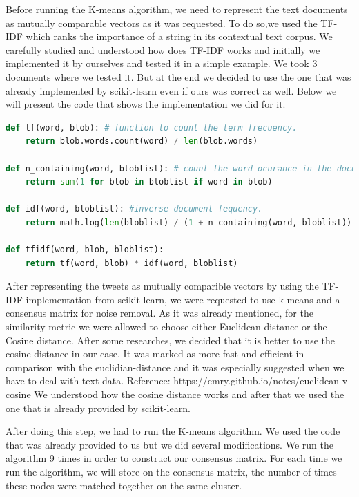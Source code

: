 \documentclass{article}
\begin{document}
Before running the K-means algorithm, we need to represent the text documents as mutually comparable vectors as it was requested. To do so,we used the TF-IDF which ranks the importance of a string in its contextual text corpus. We carefully studied and understood how does TF-IDF works and initially we implemented it by ourselves and tested it in a simple example. We took 3 documents where we tested it. But at the end we decided to use the one that was already implemented by scikit-learn even if ours was correct as well. Below we will present the code that shows the implementation we did for it. 

\begin{lstlisting}[language=Python, caption= TF-IDF implementation, label={lst:TF-IDF}]
def tf(word, blob): # function to count the term frecuency.
    return blob.words.count(word) / len(blob.words)

def n_containing(word, bloblist): # count the word ocurance in the document list.
    return sum(1 for blob in bloblist if word in blob)

def idf(word, bloblist): #inverse document fequency.
    return math.log(len(bloblist) / (1 + n_containing(word, bloblist)))

def tfidf(word, blob, bloblist):
    return tf(word, blob) * idf(word, bloblist)
           \end{lstlisting}

After representing the tweets as mutually comparible vectors by using the TF-IDF implementation from scikit-learn, we were requested to use k-means and a consensus matrix for noise removal. As it was already mentioned, for the similarity metric we were allowed to choose either Euclidean distance or the Cosine distance. After some researches, we decided that it is better to use the cosine distance in our case. It was marked as more fast and efficient in comparison with the euclidian-distance and it was especially suggested when we have to deal with text data. Reference: https://cmry.github.io/notes/euclidean-v-cosine
We understood how the cosine distance works and after that we used the one that is already provided by scikit-learn. 

After doing this step, we had to run the K-means algorithm. We used the code that was already provided to us but we did several modifications. We run the algorithm 9 times in order to construct our consensus matrix. For each time we run the algorithm, we will store on the consensus matrix, the number of times these nodes were matched together on the same cluster.
\end{document}
